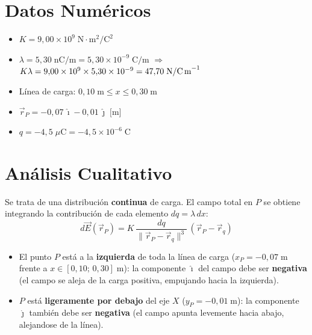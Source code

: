 \documentclass[12pt,letterpaper]{article}
\begin{document}
\section*{Datos Num\'ericos}

\begin{itemize}
    \item $K = 9{,}00 \times 10^9\;\text{N}\cdot\text{m}^2/\text{C}^2$
    \item $\lambda = 5{,}30\;\text{nC/m} = 5{,}30 \times 10^{-9}\;\text{C/m}$
    \quad$\Rightarrow$\quad $K\lambda = 9{,}00\times10^{9} \times 5{,}30\times10^{-9} = 47{,}70\;\text{N/C\,m}^{-1}$
    \item L\'inea de carga: $0{,}10\;\text{m} \le x \le 0{,}30\;\text{m}$
    \item $\vec{r}_P = -0{,}07\,\hat{\imath} - 0{,}01\,\hat{\jmath}\;\text{[m]}$
    \item $q = -4{,}5\;\mu\text{C} = -4{,}5\times10^{-6}\;\text{C}$
\end{itemize}

\section*{An\'alisis Cualitativo}

Se trata de una distribuci\'on \textbf{continua} de carga. El campo total en $P$ se obtiene integrando la contribuci\'on de cada elemento $dq = \lambda\,dx$:
\begin{equation*}
    d\vec{E}(\vec{r}_P) = K\,\frac{dq}{\|\vec{r}_P - \vec{r}_q\|^3}\,(\vec{r}_P - \vec{r}_q)
\end{equation*}

\begin{itemize}
    \item El punto $P$ est\'a a la \textbf{izquierda} de toda la l\'inea de carga ($x_P = -0{,}07\;\text{m}$ frente a $x \in [0{,}10;\,0{,}30]\;\text{m}$): la componente $\hat{\imath}$ del campo debe ser \textbf{negativa} (el campo se aleja de la carga positiva, empujando hacia la izquierda).
    \item $P$ est\'a \textbf{ligeramente por debajo} del eje $X$ ($y_P = -0{,}01\;\text{m}$): la componente $\hat{\jmath}$ tambi\'en debe ser \textbf{negativa} (el campo apunta levemente hacia abajo, alejandose de la l\'inea).
\end{itemize}

\end{document}
